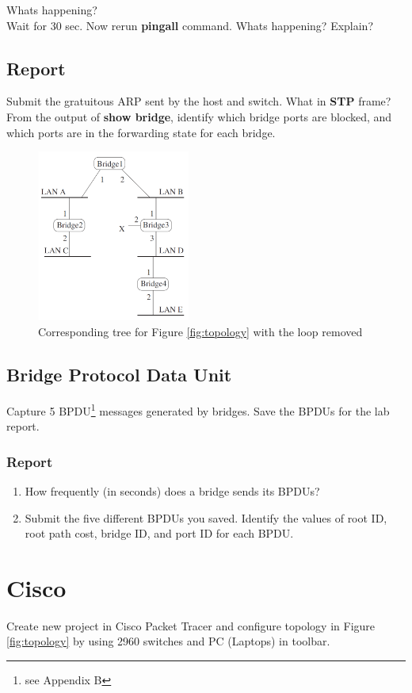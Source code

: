 \documentclass[10pt,a4paper]{article}
\numberwithin{equation}{section}
\numberwithin{figure}{section}
\numberwithin{table}{section}
\begin{document}
    Whats happening?\\
    Wait for 30 sec. Now rerun \textbf{pingall} command.
    Whats happening? Explain?

    \subsection{Report}
    Submit the gratuitous ARP sent by the host and switch. What in \textbf{STP} frame?\\
    From the output of \textbf{show bridge}, identify which bridge ports are blocked, and which ports are in the forwarding state for each bridge.

\begin{figure}[H]
    \centering
    \includegraphics[height=160pt]{img/fig1-2.png}
    \caption{Corresponding tree for Figure \ref{fig:topology} with the loop removed}
    \label{fig:topology-simple}
\end{figure}

\subsection{Bridge Protocol Data Unit}
   Capture 5 BPDU\footnote{see Appendix B} messages generated by bridges. Save the BPDUs for the lab report.
    \subsubsection*{Report}
    \begin{enumerate}
        \item How frequently (in seconds) does a bridge sends its BPDUs?
        \item Submit the five different BPDUs you saved. Identify the values of root ID, root path cost, bridge ID, and port ID for each BPDU.
    \end{enumerate}

\section{Cisco}
    Create new project in Cisco Packet Tracer and configure topology in Figure \ref{fig:topology} by using 2960 switches and PC (Laptops) in toolbar.
\end{document}
